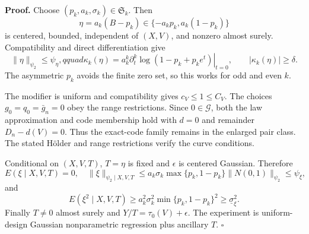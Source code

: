 \textbf{Proof.}
Choose \((p_k,a_k,\sigma_k)\in\mathfrak S_k\).  Then
\[
 \eta=a_k(B-p_k)\in\{-a_kp_k,a_k(1-p_k)\}
\]
is centered, bounded, independent of \((X,V)\), and nonzero almost surely.  Compatibility and direct differentiation give
\[
 \|\eta\|_{\psi_2}\le\psi_\eta,qquad
 \kappa_k(\eta)=a_k^k\left.\partial_t^k\log(1-p_k+p_ke^t)\right|_{t=0},
 \qquad |\kappa_k(\eta)|\ge\delta. \tag{1}
\]
The asymmetric \(p_k\) avoids the finite zero set, so this works for odd and even \(k\).

The modifier is uniform and compatibility gives \(c_V\le1\le C_V\).  The choices \(g_0=q_0=\bar g_n=0\) obey the range restrictions.  Since \(0\in\mathcal G\), both the law approximation and code membership hold with \(d=0\) and remainder \(D_n-d(V)=0\).  Thus the exact-code family remains in the enlarged pair class.  The stated H\"older and range restrictions verify the curve conditions.

Conditional on \((X,V,T)\), \(T=\eta\) is fixed and \(\epsilon\) is centered Gaussian.  Therefore
\[
 E(\xi\mid X,V,T)=0,
 \quad \|\xi\|_{\psi_2\mid X,V,T}
 \le a_k\sigma_k\max\{p_k,1-p_k\}\|N(0,1)\|_{\psi_2}\le\psi_\xi, \tag{2}
\]
and
\[
 E(\xi^2\mid X,V,T)
 \ge a_k^2\sigma_k^2\min\{p_k,1-p_k\}^2
 \ge\underline\sigma_\xi^2. \tag{3}
\]
Finally \(T\ne0\) almost surely and \(Y/T=\tau_0(V)+\epsilon\).  The experiment is uniform-design Gaussian nonparametric regression plus ancillary \(T\). \(\square\)